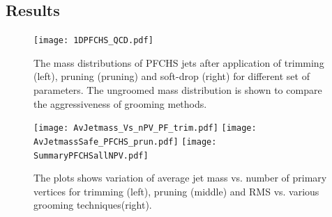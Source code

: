                   



\subsection{Results}

\begin{figure}[h]
\centering
\texttt{[image: 1DPFCHS\_QCD.pdf]}

\caption{\label{fig:grooming1D} The mass distributions of PFCHS jets after application of trimming (left), pruning (pruning) and soft-drop (right) for different set of parameters. The ungroomed mass distribution is shown to compare the aggressiveness of grooming methods. }
\end{figure}

\begin{figure}[h]
\centering
\texttt{[image: AvJetmass\_Vs\_nPV\_PF\_trim.pdf]}
\texttt{[image: AvJetmassSafe\_PFCHS\_prun.pdf]}
\texttt{[image: SummaryPFCHSallNPV.pdf]}
\caption{\label{fig:Groom}The plots shows variation of average jet mass vs. number of primary vertices for trimming (left), pruning (middle) and RMS vs. various grooming techniques(right).  }
\end{figure}

